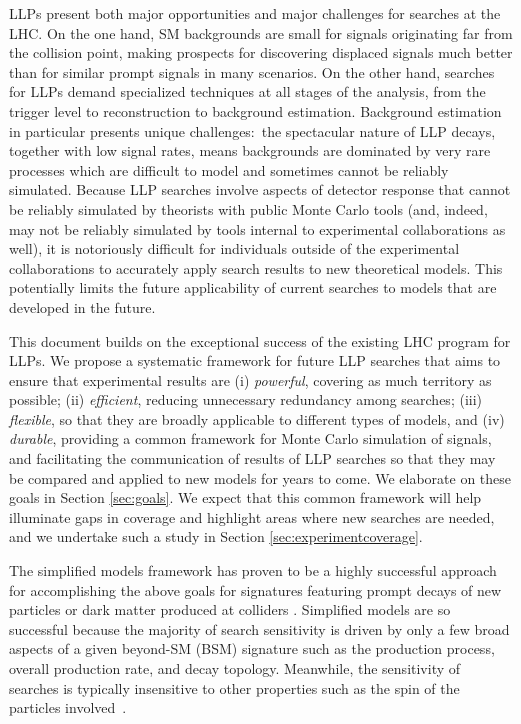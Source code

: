 LLPs present both major opportunities and major challenges for searches at the LHC.  On the one hand,  SM backgrounds are small for signals originating far from the collision point, making prospects for discovering displaced signals much better than for  similar prompt signals in many scenarios.  On the other hand, searches for LLPs demand specialized techniques at all stages of the analysis, from the trigger level to reconstruction to background estimation. Background estimation in particular presents unique challenges:~the spectacular nature of LLP decays, together with low signal rates, means backgrounds are dominated by very rare processes which are difficult to model and sometimes cannot be reliably simulated.  Because LLP searches involve aspects of detector response that cannot be reliably simulated by theorists with public Monte Carlo tools (and, indeed, may not be reliably simulated by tools internal to experimental collaborations as well), it is notoriously difficult for individuals outside of the experimental collaborations to accurately apply search results to new theoretical models. This  potentially limits the future applicability of current searches to models that are developed in the future.  

This document builds on the exceptional success of the existing LHC program for LLPs. We propose a systematic framework for future LLP searches that aims to ensure that experimental results are (i) {\em powerful}, covering as much territory as possible; (ii) {\em efficient}, reducing unnecessary redundancy among searches; (iii) {\em flexible}, so that they are broadly applicable to different types of models, and (iv) {\em durable}, providing a common framework for Monte Carlo simulation of signals, and facilitating the communication of results of LLP searches so that they may be compared and applied to new models for years to come. We elaborate on these goals in Section \ref{sec:goals}.
We expect that this common framework will help illuminate gaps in coverage and highlight areas where new searches are needed, and we undertake such a study in Section \ref{sec:experimentcoverage}.


The simplified models framework has proven to be a highly successful approach for accomplishing the above goals for signatures featuring prompt decays of new particles \cite{Alves:2011wf} or dark matter produced at colliders \cite{Abdallah:2015ter}.  Simplified models are so successful because the majority of search sensitivity is driven by only a few broad aspects of a given beyond-SM (BSM) signature such as the production process, overall production rate, and decay topology. Meanwhile, the sensitivity of searches is typically insensitive to other properties such as the spin of the particles involved~\cite{Edelhauser:2015ksa,Edelhauser:2014ena,Arina:2015uea,Kraml:2016eti}.

